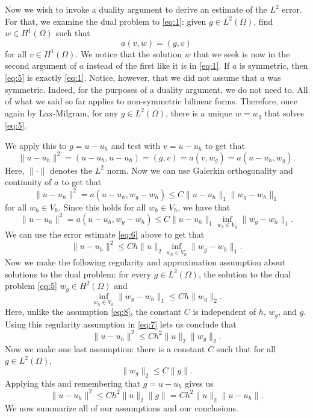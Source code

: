 \documentclass{article}
\theoremstyle{plain}
\begin{document}
Now we wish to invoke a duality argument to derive an estimate of the $L^2$ error.
For that, we examine the dual problem to \eqref{eq:1}: given $g \in L^2(\Omega)$, find $w \in H^1(\Omega)$ such that
\begin{equation}\label{eq:5}
	a(v,w) = (g,v)
\end{equation}
for all $v \in H^1(\Omega)$.
We notice that the solution $w$ that we seek is now in the second argument of $a$ instead of the first like it is in \eqref{eq:1}.
If $a$ is symmetric, then \eqref{eq:5} is exactly \eqref{eq:1}.
Notice, however, that we did not assume that $a$ was symmetric.
Indeed, for the purposes of a duality argument, we do not need to.
All of what we said so far applies to non-symmetric bilinear forms.
Therefore, once again by Lax-Milgram, for any $g \in L^2(\Omega)$, there is a unique $w = w_g$ that solves \eqref{eq:5}.

We apply this to $g = u-u_h$ and test with $v = u-u_h$ to get that
\begin{equation}
	\|u-u_h\|^2 = (u-u_h,u-u_h) = (g,v) = a(v,w_g) = a(u-u_h,w_g).
\end{equation}
Here, $\|\cdot\|$ denotes the $L^2$ norm.
Now we can use Galerkin orthogonality and continuity of $a$ to get that
\begin{equation}
	\|u-u_h\|^2 = a(u-u_h, w_g-w_h) \leq C\|u-u_h\|_1\|w_g-w_h\|_1
\end{equation}
for all $w_h \in V_h$.
Since this holds for all $w_h \in V_h$, we have that
\begin{equation}
	\|u-u_h\|^2 = a(u-u_h, w_g-w_h) \leq C\|u-u_h\|_1\inf_{w_h\in V_h}\|w_g-w_h\|_1.
\end{equation}
We can use the error estimate \eqref{eq:6} above to get that
\begin{equation}\label{eq:7}
	\|u-u_h\|^2 \leq Ch\|u\|_2\inf_{w_h\in V_h}\|w_g-w_h\|_1.
\end{equation}
Now we make the following regularity and approximation assumption about solutions to the dual problem: for every $g \in L^2(\Omega)$, the solution to the dual problem \eqref{eq:5} $w_g \in H^2(\Omega)$ and
\begin{equation}
	\inf_{w_h \in V_h}\|w_g-w_h\|_1 \leq Ch\|w_g\|_2.
\end{equation}
Here, unlike the assumption \eqref{eq:8}, the constant $C$ is independent of $h$, $w_g$, and $g$.
Using this regularity assumption in \eqref{eq:7} lets us conclude that
\begin{equation}
	\|u-u_h\|^2 \leq Ch^2\|u\|_2\|w_g\|_2.
\end{equation}
Now we make one last assumption: there is a constant $C$ such that for all $g \in L^2(\Omega)$,
\begin{equation}
	\|w_g\|_2 \leq C\|g\|.
\end{equation}
Applying this and remembering that $g = u-u_h$ gives us
\begin{equation}
	\|u-u_h\|^2 \leq Ch^2\|u\|_2\|g\| = Ch^2\|u\|_2\|u-u_h\|.
\end{equation}
We now summarize all of our assumptions and our conclusions.
\end{document}
